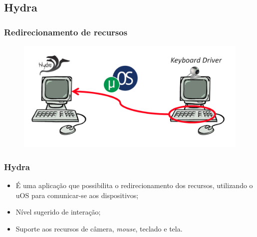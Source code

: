 \documentclass{beamer}
\begin{document}
		\subsection{Hydra}
		\begin{frame}
			\frametitle{Redirecionamento de recursos}
			
			\begin{figure}[h]
				\centering \includegraphics[scale=.25]{figuras/hydra_redirecionamento.png}
			\end{figure}
		\end{frame}
		
		\begin{frame}
			\frametitle{Hydra}
			
			\begin{itemize}
				\item É uma aplicação que possibilita o redirecionamento dos recursos, 
						utilizando o uOS para comunicar-se aos dispositivos; 
				\item Nível sugerido de interação;  
				\item Suporte aos recursos de câmera, \emph{mouse}, teclado e tela.
			\end{itemize}
		\end{frame}
		
\end{document}
